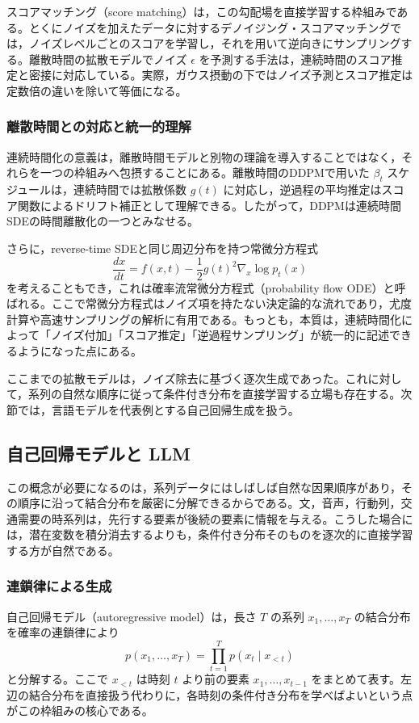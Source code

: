 スコアマッチング（score matching）は，この勾配場を直接学習する枠組みである。とくにノイズを加えたデータに対するデノイジング・スコアマッチングでは，ノイズレベルごとのスコアを学習し，それを用いて逆向きにサンプリングする。離散時間の拡散モデルでノイズ \(\epsilon\) を予測する手法は，連続時間のスコア推定と密接に対応している。実際，ガウス摂動の下ではノイズ予測とスコア推定は定数倍の違いを除いて等価になる。

\subsubsection{離散時間との対応と統一的理解}

連続時間化の意義は，離散時間モデルと別物の理論を導入することではなく，それらを一つの枠組みへ包摂することにある。離散時間のDDPMで用いた \(\beta_t\) スケジュールは，連続時間では拡散係数 \(g(t)\) に対応し，逆過程の平均推定はスコア関数によるドリフト補正として理解できる。したがって，DDPMは連続時間SDEの時間離散化の一つとみなせる。

さらに，reverse-time SDEと同じ周辺分布を持つ常微分方程式
\[
\frac{dx}{dt}
=
f(x,t)-\frac{1}{2}g(t)^2\nabla_x \log p_t(x)
\]
を考えることもでき，これは確率流常微分方程式（probability flow ODE）と呼ばれる。ここで常微分方程式はノイズ項を持たない決定論的な流れであり，尤度計算や高速サンプリングの解析に有用である。もっとも，本質は，連続時間化によって「ノイズ付加」「スコア推定」「逆過程サンプリング」が統一的に記述できるようになった点にある。

ここまでの拡散モデルは，ノイズ除去に基づく逐次生成であった。これに対して，系列の自然な順序に従って条件付き分布を直接学習する立場も存在する。次節では，言語モデルを代表例とする自己回帰生成を扱う。

\subsection{自己回帰モデルと LLM}

この概念が必要になるのは，系列データにはしばしば自然な因果順序があり，その順序に沿って結合分布を厳密に分解できるからである。文，音声，行動列，交通需要の時系列は，先行する要素が後続の要素に情報を与える。こうした場合には，潜在変数を積分消去するよりも，条件付き分布そのものを逐次的に直接学習する方が自然である。

\subsubsection{連鎖律による生成}

自己回帰モデル（autoregressive model）は，長さ \(T\) の系列 \(x_1,\dots,x_T\) の結合分布を確率の連鎖律により
\[
p(x_1,\dots,x_T) = \prod_{t=1}^{T} p(x_t \mid x_{<t})
\]
と分解する。ここで \(x_{<t}\) は時刻 \(t\) より前の要素 \(x_1,\dots,x_{t-1}\) をまとめて表す。左辺の結合分布を直接扱う代わりに，各時刻の条件付き分布を学べばよいという点がこの枠組みの核心である。

